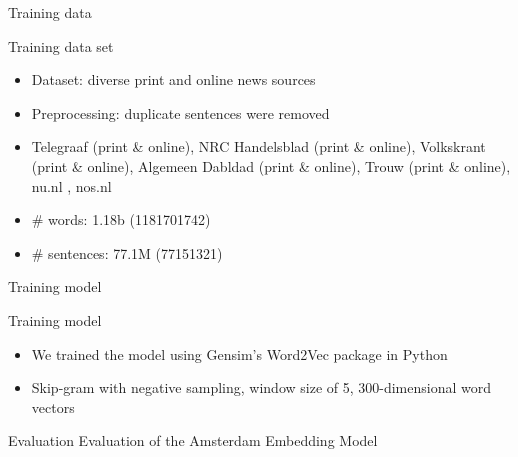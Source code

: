 \documentclass{beamer}
\begin{document}



\begin{frame}{Training data}
\begin{block}{Training data set}
\begin{itemize}
\item Dataset: diverse print and online news sources
\item Preprocessing: duplicate sentences were removed
\item Telegraaf (print \& online), NRC Handelsblad (print \& online), Volkskrant (print \& online), Algemeen Dabldad (print \& online), Trouw (print \& online), nu.nl , nos.nl
\item \# words: 1.18b (1181701742)
\item \# sentences: 77.1M (77151321)
\end{itemize}
\end{block}
\end{frame}

\begin{frame}{Training model}
\begin{block}{Training model}
\begin{itemize}
\item We trained the model using Gensim's Word2Vec package in Python
\item Skip-gram with negative sampling, window size of 5, 300-dimensional word vectors
\end{itemize}
\end{block}
\end{frame}

\begin{frame}{Evaluation}
Evaluation of the Amsterdam Embedding Model
\end{frame}
\end{document}
